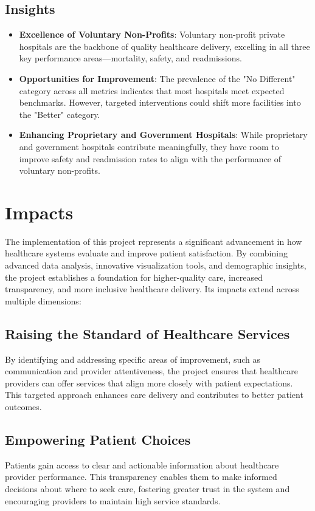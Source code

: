 \subsection{Insights}
\begin{itemize}
    \item \textbf{Excellence of Voluntary Non-Profits}: Voluntary non-profit private hospitals are the backbone of quality healthcare delivery, excelling in all three key performance areas—mortality, safety, and readmissions.
    \item \textbf{Opportunities for Improvement}: The prevalence of the "No Different" category across all metrics indicates that most hospitals meet expected benchmarks. However, targeted interventions could shift more facilities into the "Better" category.
    \item \textbf{Enhancing Proprietary and Government Hospitals}: While proprietary and government hospitals contribute meaningfully, they have room to improve safety and readmission rates to align with the performance of voluntary non-profits.
\end{itemize}


\section{Impacts}

The implementation of this project represents a significant advancement in how healthcare systems evaluate and improve patient satisfaction. By combining advanced data analysis, innovative visualization tools, and demographic insights, the project establishes a foundation for higher-quality care, increased transparency, and more inclusive healthcare delivery. Its impacts extend across multiple dimensions:

\subsection{Raising the Standard of Healthcare Services}
By identifying and addressing specific areas of improvement, such as communication and provider attentiveness, the project ensures that healthcare providers can offer services that align more closely with patient expectations. This targeted approach enhances care delivery and contributes to better patient outcomes.

\subsection{Empowering Patient Choices}
Patients gain access to clear and actionable information about healthcare provider performance. This transparency enables them to make informed decisions about where to seek care, fostering greater trust in the system and encouraging providers to maintain high service standards.

